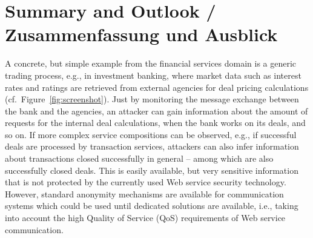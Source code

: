 \section{Summary and Outlook / Zusammenfassung und Ausblick}
A concrete, but simple example from the financial services domain is a generic trading process, e.g., in investment banking, where market data such as interest rates and ratings are retrieved from external agencies for deal pricing calculations (cf.~Figure~\ref{fig:screenshot}). Just by monitoring the message exchange between the bank and the agencies, an attacker can gain information about the amount of requests for the internal deal calculations, when the bank works on its deals, and so on. If more complex service compositions can be observed, e.g., if successful deals are processed by transaction services, attackers can also infer information about transactions closed successfully in general -- among which are also successfully closed deals. This is easily available, but very sensitive information that is not protected by the currently used Web service security technology. However, standard anonymity mechanisms are available for communication systems which could be used until dedicated solutions are available, i.e., taking into account the high Quality of Service (QoS) requirements of Web service communication. 

